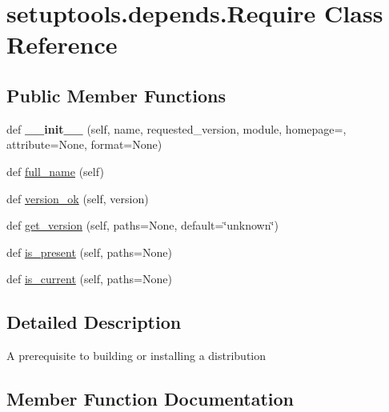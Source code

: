 \hypertarget{classsetuptools_1_1depends_1_1_require}{}\section{setuptools.\+depends.\+Require Class Reference}
\label{classsetuptools_1_1depends_1_1_require}
\subsection*{Public Member Functions}
\begin{DoxyCompactItemize}
\item 
\mbox{\label{classsetuptools_1_1depends_1_1_require_ad6f42643730b7c327b4c28ed4c675899}} 
def {\bfseries \+\_\+\+\_\+init\+\_\+\+\_\+} (self, name, requested\+\_\+version, module, homepage=\textquotesingle{}\textquotesingle{}, attribute=None, format=None)
\item 
def \hyperlink{classsetuptools_1_1depends_1_1_require_aafeb6a0853fe7b53c649a90b4860aa1b}{full\+\_\+name} (self)
\item 
def \hyperlink{classsetuptools_1_1depends_1_1_require_ae09a6a0a9d85091433a92026a2540e27}{version\+\_\+ok} (self, version)
\item 
def \hyperlink{classsetuptools_1_1depends_1_1_require_aa726406933884cdfc0a0a13b01920734}{get\+\_\+version} (self, paths=None, default=\char`\"{}unknown\char`\"{})
\item 
def \hyperlink{classsetuptools_1_1depends_1_1_require_a69771b02a8e6f6aee88cf1e9dfa0b6d4}{is\+\_\+present} (self, paths=None)
\item 
def \hyperlink{classsetuptools_1_1depends_1_1_require_aca429ced44bae94f3ff8af55745d60ed}{is\+\_\+current} (self, paths=None)
\end{DoxyCompactItemize}


\subsection{Detailed Description}
\begin{DoxyVerb}A prerequisite to building or installing a distribution\end{DoxyVerb}
 

\subsection{Member Function Documentation}
\mbox{\label{classsetuptools_1_1depends_1_1_require_aafeb6a0853fe7b53c649a90b4860aa1b}} 
